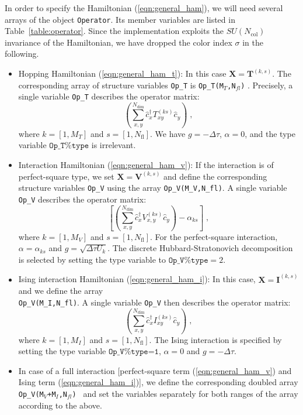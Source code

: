 %
In order to specify the  Hamiltonian (\ref{eqn:general_ham}), we will  need several arrays of the object \texttt{Operator}. 
Its member variables are listed in Table~\ref{table:operator}.  
Since the implementation exploits the $SU(N_{\mathrm{col}})$ invariance of the Hamiltonian, we have dropped the color index $\sigma$ in the following.
\begin{itemize}
\item Hopping Hamiltonian (\ref{eqn:general_ham_t}): 
In this case $\bm{X}=\bm{T}^{(k,s)}$. The corresponding array of structure variables \texttt{Op\_T} is  \texttt{Op\_T(M$_T$,N$_{fl}$)} . 
Precisely, a single variable  \texttt{Op\_T}  describes the operator matrix:
\begin{equation}
            \left( \sum_{x,y}^{N_{\mathrm{dim}}} \hat{c}^{\dagger}_x T_{xy}^{(ks)} \hat{c}^{\phantom{\dagger}}_{y}  \right)  \;,
\end{equation} 
where $k=[1, M_{T}]$ and $s=[1, N_{\mathrm{fl}}]$.
We have $g=-\Delta \tau$, $\alpha = 0$, and the type variable $\texttt{Op\_T\%type}$  is irrelevant. 



\item Interaction Hamiltonian (\ref{eqn:general_ham_v}):
If the interaction is of perfect-square type, we set  ${\bm X}  = \bm{V}^{(k,s)}$ 
and  define the corresponding structure variables \texttt{Op\_V}  using the array \texttt{Op\_V(M\_V,N\_{fl})}.
A single variable  \texttt{Op\_V}  describes the operator matrix:
\begin{equation}
             \left[ \left( \sum_{x,y}^{N_{\mathrm{dim}}} \hat{c}^{\dagger}_x V_{x,y}^{(ks)} \hat{c}^{\phantom{\dagger}}_{y}  \right) - \alpha_{ks} \right]  \;,
\end{equation} 
where $k=[1, M_{V}]$ and $s=[1, N_{\mathrm{fl}}]$. For the perfect-square interaction, $\alpha = \alpha_{ks}$ and $g = \sqrt{\Delta \tau  U_k}$. 
The discrete Hubbard-Stratonovich decomposition is selected by setting the type variable to $\texttt{Op\_V\%type}=2$.

\item Ising interaction Hamiltonian (\ref{eqn:general_ham_i}):
In this case, $\bm{X}  = \bm{I}^{(k,s)} $ and we define the array\\ \texttt{Op\_V(M\_I,N\_{fl})}.  
A single variable  \texttt{Op\_V} then  describes the operator matrix:
\begin{equation}
            \left( \sum_{x,y}^{N_{\mathrm{dim}}} \hat{c}^{\dagger}_x I_{xy}^{(ks)} \hat{c}^{\phantom{\dagger}}_{y}  \right)  \;,
\end{equation} 
where $k=[1, M_{I}]$ and $s=[1, N_{\mathrm{fl}}]$.
The Ising interaction is specified by setting the type variable  $\texttt{Op\_V\%type=1}$, $\alpha = 0$ and $g = -\Delta \tau$.  

\item In case of a full interaction [perfect-square term (\ref{eqn:general_ham_v}) and Ising term (\ref{eqn:general_ham_i})], we  define  the corresponding doubled array \texttt{Op\_V(M$_V$+M$_I$,N$_{fl}$) } and set the variables separately for both ranges of the array according to the above.  

\end{itemize}
